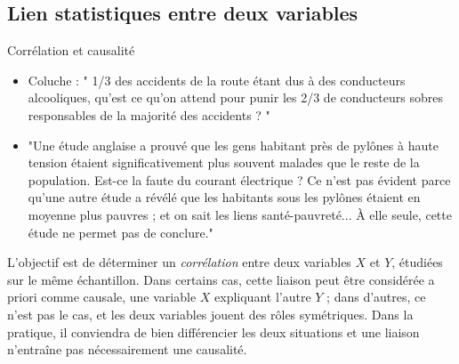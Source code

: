 \documentclass[10pt, french]{beamer}
\begin{document}
\subsection{Lien statistiques entre deux variables}
\begin{frame}{Corrélation et causalité}
\begin{itemize}
\item Coluche : " 1/3 des accidents de la route étant dus à des conducteurs alcooliques, 
qu'est ce qu'on attend pour punir les 2/3 de conducteurs sobres responsables de la majorité des accidents ? "
\item "Une étude anglaise a prouvé que les gens habitant près de pylônes à haute tension étaient significativement plus souvent malades que le reste de la population. Est-ce la faute du courant électrique ? Ce n'est pas évident parce qu'une autre étude a révélé que les habitants sous les pylônes étaient en moyenne plus pauvres ; et on sait les liens santé-pauvreté... À elle seule, cette étude ne permet pas de conclure."
\end{itemize}
L'objectif est de déterminer un \textit{corrélation} entre deux variables $X$ et $Y$, étudiées sur le même échantillon. Dans certains
cas, cette liaison peut être considérée a priori comme causale, une variable $X$
expliquant l'autre $Y$ ; dans d'autres, ce n'est pas le cas, et les deux variables
jouent des rôles symétriques. Dans la pratique, il conviendra de bien différencier les deux situations et une liaison n'entraîne pas nécessairement une
causalité.
\end{frame}
\end{document}
